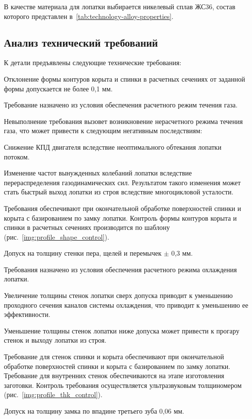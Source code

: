 В качестве материала для лопатки выбирается никелевый сплав ЖС36, состав которого представлен в~\ref{tab:technology-alloy-properties}.

\subsection{Анализ технический требований}

К детали предъявлены следующие технические требования:

Отклонение формы контуров корыта и спинки в расчетных сечениях от заданной формы допускается не более 0,1 мм.

Требование назначено из условия обеспечения расчетного режим течения газа.

Невыполнение требования вызовет возникновение нерасчетного режима течения газа, что может привести к следующим негативным последствиям:

Снижение КПД двигателя вследствие неоптимального обтекания лопатки потоком.

Изменение частот вынужденных колебаний лопатки вследствие перераспределения газодинамических сил. Результатом такого изменения может стать быстрый выход лопатки из строя вследствие многоцикловой усталости.

Требования обеспечивают при окончательной обработке поверхностей спинки и корыта с базированием по замку лопатки.
Контроль формы контуров корыта и спинки в расчетных сечениях производится по шаблону (рис.~\ref{img:profile_shape_control}).

Допуск на  толщину стенки пера, щелей и перемычек $\pm$ 0,3 мм.

Требования назначено из условия обеспечения расчетного режима охлаждения лопатки.

Увеличение толщины стенок лопатки сверх допуска приводит к уменьшению проходного сечения каналов системы охлаждения, что приводит к уменьшению ее эффективности.

Уменьшение толщины стенок лопатки ниже допуска может привести к прогару стенок и выходу лопатки из строя.

Требование для стенок спинки и корыта обеспечивают при окончательной обработке поверхностей спинки и корыта с базированием по замку лопатки. Требование для внутренних стенок обеспечиваются на этапе изготовления заготовки.
Контроль требования осуществляется ультразвуковым толщиномером (рис.~\ref{img:profile_thk_control}).

Допуск на толщину замка по впадине третьего зуба 0,06 мм.

